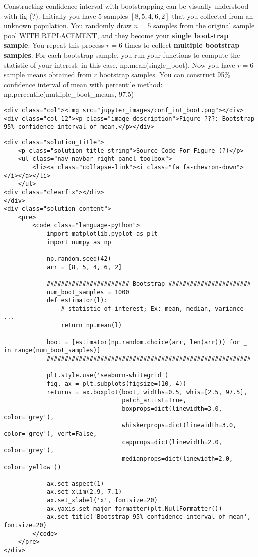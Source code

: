 \documentclass[11pt]{article}
\begin{document}
Constructing confidence interval with bootstrapping can be visually
understood with fig (?). Initially you have 5 samples
{\([8, 5, 4, 6, 2]\)} that you collected from an unknown population. You
randomly draw \(n=5\) samples from the original sample pool WITH
REPLACEMENT, and they become your \textbf{single bootstrap sample}. You
repeat this process \(r=6\) times to collect \textbf{multiple bootstrap
samples}. For each bootstrap sample, you run your functions to compute
the statistic of your interest: in this case, np.mean(single\_boot). Now
you have \(r=6\) sample means obtained from \(r\) bootstrap samples. You
can construct 95\% confidence interval of mean with percentile method:
np.percentile(mutliple\_boot\_means, 97.5)

\begin{verbatim}
<div class="col"><img src="jupyter_images/conf_int_boot.png"></div>
<div class="col-12"><p class="image-description">Figure ???: Bootstrap 95% confidence interval of mean.</p></div>
\end{verbatim}

    \begin{verbatim}
<div class="solution_title">
    <p class="solution_title_string">Source Code For Figure (?)</p>
    <ul class="nav navbar-right panel_toolbox">
        <li><a class="collapse-link"><i class="fa fa-chevron-down"></i></a></li>
    </ul>
<div class="clearfix"></div>
</div>
<div class="solution_content">
    <pre>
        <code class="language-python">
            import matplotlib.pyplot as plt
            import numpy as np

            np.random.seed(42)
            arr = [8, 5, 4, 6, 2]

            ####################### Bootstrap ####################### 
            num_boot_samples = 1000
            def estimator(l):
                # statistic of interest; Ex: mean, median, variance ...
                return np.mean(l)

            boot = [estimator(np.random.choice(arr, len(arr))) for _ in range(num_boot_samples)]
            #########################################################

            plt.style.use('seaborn-whitegrid')
            fig, ax = plt.subplots(figsize=(10, 4))
            returns = ax.boxplot(boot, widths=0.5, whis=[2.5, 97.5],
                                 patch_artist=True, 
                                 boxprops=dict(linewidth=3.0, color='grey'),
                                 whiskerprops=dict(linewidth=3.0, color='grey'), vert=False,
                                 capprops=dict(linewidth=2.0, color='grey'),
                                 medianprops=dict(linewidth=2.0, color='yellow'))

            ax.set_aspect(1)
            ax.set_xlim(2.9, 7.1)
            ax.set_xlabel('x', fontsize=20)
            ax.yaxis.set_major_formatter(plt.NullFormatter())
            ax.set_title('Bootstrap 95% confidence interval of mean', fontsize=20)
        </code>
    </pre>
</div>
\end{verbatim}
\end{document}
